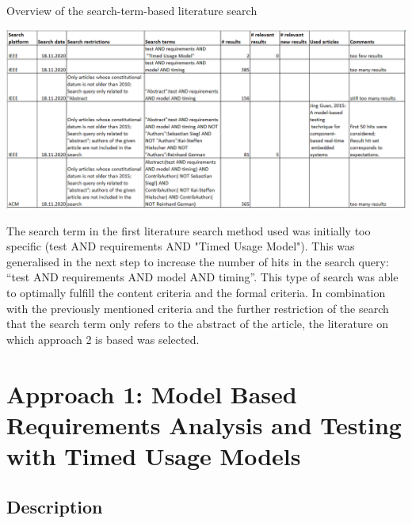 \begin{table}[h]
	\centering
	\caption{Overview of the search-term-based literature search}
	\includegraphics[scale=0.7]{../images/SearchTermTable} 
\end{table}
The search term in the first literature search method used was initially
too specific (test AND requirements AND "Timed Usage
Model"). This was generalised in the next step to increase
the number of hits in the search query: \enquote{test AND requirements
AND model AND timing}. This type of search was able to
optimally fulfill the content criteria and the formal criteria. In
combination with the previously mentioned criteria and the further
restriction of the search that the search term only refers to the
abstract of the article, the literature on which approach 2 is based
was selected.

\section{Approach 1: Model Based Requirements Analysis and Testing with Timed
Usage Models\label{sec:Approach-1}}

\subsection{Description}

